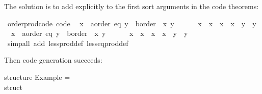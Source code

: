 \begin{isabellebody}
\begin{isamarkuptext}
  The solution is to add  explicitly to the first sort arguments in the
  code theorems:%
\end{isamarkuptext}%
\isamarkuptrue%
%
\isadelimquote
%
\endisadelimquote
%
\isatagquote
{}\isamarkupfalse%
\ order{\isacharunderscore}prod{\isacharunderscore}code\ {\isacharbrackleft}code{\isacharbrackright}{\isacharcolon}\isanewline
\ \ {\isachardoublequoteopen}{\isacharparenleft}x{}\ {\isasymColon}\ {\isacharprime}a{\isasymColon}{\isacharbraceleft}order{\isacharcomma}\ eq{\isacharbraceright}{\isacharcomma}\ y{}\ {\isasymColon}\ {\isacharprime}b{\isasymColon}order{\isacharparenright}\ {\isacharless}\ {\isacharparenleft}x{}{\isacharcomma}\ y{}{\isacharparenright}\ {\isasymlongleftrightarrow}\isanewline
\ \ \ \ \ x{}\ {\isacharless}\ x{}\ {\isasymor}\ x{}\ {\isacharequal}\ x{}\ {\isasymand}\ y{}\ {\isacharless}\ y{}{\isachardoublequoteclose}\isanewline
\ \ {\isachardoublequoteopen}{\isacharparenleft}x{}\ {\isasymColon}\ {\isacharprime}a{\isasymColon}{\isacharbraceleft}order{\isacharcomma}\ eq{\isacharbraceright}{\isacharcomma}\ y{}\ {\isasymColon}\ {\isacharprime}b{\isasymColon}order{\isacharparenright}\ {\isasymle}\ {\isacharparenleft}x{}{\isacharcomma}\ y{}{\isacharparenright}\ {\isasymlongleftrightarrow}\isanewline
\ \ \ \ \ x{}\ {\isacharless}\ x{}\ {\isasymor}\ x{}\ {\isacharequal}\ x{}\ {\isasymand}\ y{}\ {\isasymle}\ y{}{\isachardoublequoteclose}\isanewline
\ \ \isamarkupfalse%
\ {\isacharparenleft}simp{\isacharunderscore}all\ add{\isacharcolon}\ less{\isacharunderscore}prod{\isacharunderscore}def\ less{\isacharunderscore}eq{\isacharunderscore}prod{\isacharunderscore}def{\isacharparenright}%
\endisatagquote
{\isafoldquote}%
%
\isadelimquote
%
\endisadelimquote
%
\begin{isamarkuptext}%
\noindent Then code generation succeeds:%
\end{isamarkuptext}%
\isamarkuptrue%
%
\isadelimquote
%
\endisadelimquote
%
\isatagquote
%
\begin{isamarkuptext}%
\isaverbatim%
\noindent%
\hspace*{0pt}structure Example = \\
\hspace*{0pt}struct\\
\hspace*{0pt}\\

\end{isamarkuptext}
\end{isabellebody}
